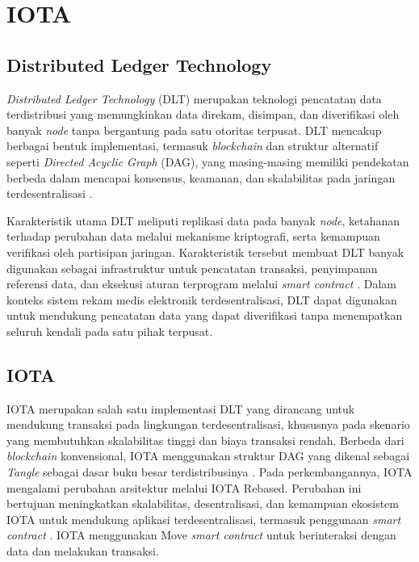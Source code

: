 \section{IOTA}
\label{sec:iota}

\subsection{Distributed Ledger Technology}
\label{subsec:dlt}

\textit{Distributed Ledger Technology} (DLT) merupakan teknologi pencatatan data terdistribusi yang memungkinkan data direkam, disimpan, dan diverifikasi oleh banyak \textit{node} tanpa bergantung pada satu otoritas terpusat. DLT mencakup berbagai bentuk implementasi, termasuk \textit{blockchain} dan struktur alternatif seperti \textit{Directed Acyclic Graph} (DAG), yang masing-masing memiliki pendekatan berbeda dalam mencapai konsensus, keamanan, dan skalabilitas pada jaringan terdesentralisasi \autocite{savadatti2025survey}.

Karakteristik utama DLT meliputi replikasi data pada banyak \textit{node}, ketahanan terhadap perubahan data melalui mekanisme kriptografi, serta kemampuan verifikasi oleh partisipan jaringan. Karakteristik tersebut membuat DLT banyak digunakan sebagai infrastruktur untuk pencatatan transaksi, penyimpanan referensi data, dan eksekusi aturan terprogram melalui \textit{smart contract} \autocite{savadatti2025survey}. Dalam konteks sistem rekam medis elektronik terdesentralisasi, DLT dapat digunakan untuk mendukung pencatatan data yang dapat diverifikasi tanpa menempatkan seluruh kendali pada satu pihak terpusat.

\subsection{IOTA}
\label{subsec:iota}

IOTA merupakan salah satu implementasi DLT yang dirancang untuk mendukung transaksi pada lingkungan terdesentralisasi, khususnya pada skenario yang membutuhkan skalabilitas tinggi dan biaya transaksi rendah. Berbeda dari \textit{blockchain} konvensional, IOTA menggunakan struktur DAG yang dikenal sebagai \textit{Tangle} sebagai dasar buku besar terdistribusinya \autocite{sedi2025from}. Pada perkembangannya, IOTA mengalami perubahan arsitektur melalui IOTA Rebased. Perubahan ini bertujuan meningkatkan skalabilitas, desentralisasi, dan kemampuan ekosistem IOTA untuk mendukung aplikasi terdesentralisasi, termasuk penggunaan \textit{smart contract} \autocite{sedi2025from}. IOTA menggunakan Move \textit{smart contract} untuk berinteraksi dengan data dan melakukan transaksi.

